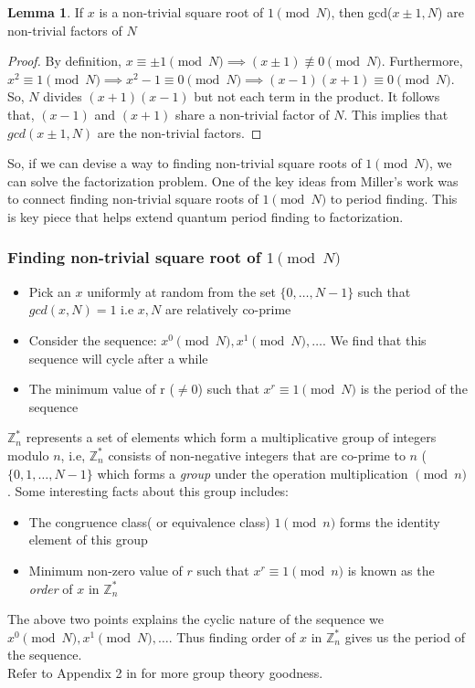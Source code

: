 \documentclass[11.5pt, paper=a4]{article}
\theoremstyle{definition}
\newtheorem{lemma}[theorem]{Lemma}
\numberwithin{theorem}{section}
\begin{document}
\begin{lemma}
\label{thm:non-triv-sqr-root-lemma}
If $x$ is a non-trivial square root of $1\pmod{N}$, then gcd($x\pm 1, N$) are non-trivial factors of $N$
\end{lemma}
\begin{proof}
    By definition, $x \equiv \pm 1\pmod{N} \implies (x\pm 1) \not\equiv 0\pmod{N}$. Furthermore, $x^2 \equiv 1\pmod{N} \implies x^2-1 \equiv 0\pmod{N} \implies (x-1)(x+1) \equiv 0\pmod{N}$. So, $N$ divides $(x+1)(x-1)$ but not each term in the product. It follows that, $(x-1)$ and $(x+1)$ share a non-trivial factor of $N$. This implies that $gcd(x\pm 1, N)$ are the non-trivial factors.
\end{proof}

So, if we can devise a way to finding non-trivial square roots of $1\pmod{N}$, we can solve the factorization problem. One of the key ideas from Miller's work was to connect finding non-trivial square roots of $1\pmod{N}$ to period finding. This is key piece that helps extend quantum period finding to factorization.

\subsubsection{Finding non-trivial square root of $1\pmod{N}$}
\begin{itemize}
    \item Pick an $x$ uniformly at random from the set $\{0, \dots, N-1\}$ such that $gcd(x, N) = 1$ i.e $x, N$ are relatively co-prime
    \item Consider the sequence: $x^0\pmod{N}, x^1\pmod{N},\dots$. We find that this sequence will cycle after a while
    \item The minimum value of r ($\ne 0$) such that $x^r \equiv 1\pmod{N}$ is the period of the sequence
\end{itemize}

\begin{tcolorbox}[sharp corners,title=Brief detour into $\mathbb{Z}^*_n$]
$\mathbb{Z}^*_n$ represents a set of elements which form a multiplicative group of integers modulo $n$, i.e, $\mathbb{Z}^*_n$ consists of non-negative integers that are co-prime to $n$ ($\{0, 1, \dots, N-1\}$ which forms a \emph{group} under the operation multiplication $\pmod{n}$. Some interesting facts about this group includes:
\begin{itemize}
    \item The congruence class( or equivalence class) $1\pmod{n}$ forms the identity element of this group
    \item Minimum non-zero value of $r$ such that $x^r \equiv 1\pmod{n}$ is known as the \emph{order} of $x$ in $\mathbb{Z}^*_n$
\end{itemize}

The above two points explains the cyclic nature of the sequence we $x^0\pmod{N}, x^1\pmod{N},\dots$. Thus finding order of $x$ in $\mathbb{Z}^*_n$  gives us the period of the sequence.\\

Refer to Appendix 2 in \cite{nielsen2002quantum} for more group theory goodness.
\end{tcolorbox}
\end{document}
